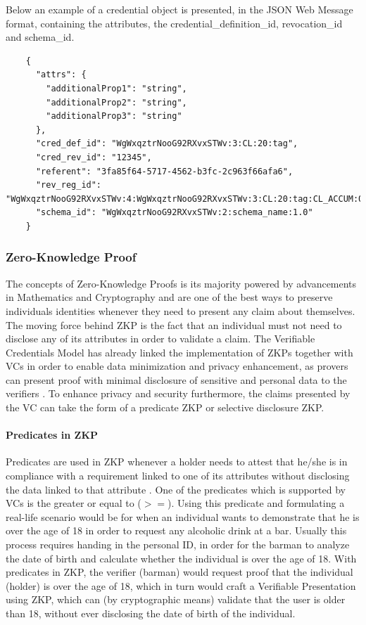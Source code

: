 
Below an example of a credential object is presented, in the JSON Web Message format, containing the attributes, the credential\_definition\_id, revocation\_id and schema\_id.

\begin{verbatim}
    {
      "attrs": {
        "additionalProp1": "string",
        "additionalProp2": "string",
        "additionalProp3": "string"
      },
      "cred_def_id": "WgWxqztrNooG92RXvxSTWv:3:CL:20:tag",
      "cred_rev_id": "12345",
      "referent": "3fa85f64-5717-4562-b3fc-2c963f66afa6",
      "rev_reg_id": "WgWxqztrNooG92RXvxSTWv:4:WgWxqztrNooG92RXvxSTWv:3:CL:20:tag:CL_ACCUM:0",
      "schema_id": "WgWxqztrNooG92RXvxSTWv:2:schema_name:1.0"
    }
\end{verbatim}

\subsubsection{Zero-Knowledge Proof}
\label{subsubsec:ZKP}

The concepts of Zero-Knowledge Proofs is its majority powered by advancements in Mathematics and Cryptography and are one of the best ways to preserve individuals identities whenever they need to present any claim about themselves.
The moving force behind ZKP is the fact that an individual must not need to disclose any of its attributes in order to validate a claim. The Verifiable Credentials Model has already linked the implementation of ZKPs together with VCs in order to enable data minimization and privacy enhancement, as provers can present proof with minimal disclosure of sensitive and personal data to the verifiers \cite{terzi2020securing}\cite{Zundel:19:VCD}. To enhance privacy and security furthermore, the claims presented by the VC can take the form of a predicate ZKP or selective disclosure ZKP. 

\paragraph{Predicates in ZKP}

Predicates are used in ZKP whenever a holder needs to attest that he/she is in compliance with a requirement linked to one of its attributes without disclosing the data linked to that attribute \cite{bertino2010identity} \cite{bartolomeu2019self}. 
One of the predicates which is supported by VCs is the greater or equal to ($>=$). Using this predicate and formulating a real-life scenario would be for when an individual wants to demonstrate that he is over the age of 18 in order to request any alcoholic drink at a bar. Usually this process requires handing in the personal ID, in order for the barman to analyze the date of birth and calculate whether the individual is over the age of 18. With predicates in ZKP, the verifier (barman) would request proof that the individual (holder) is over the age of 18, which in turn would craft a Verifiable Presentation using ZKP, which can (by cryptographic means) validate that the user is older than 18, without ever disclosing the date of birth of the individual.

